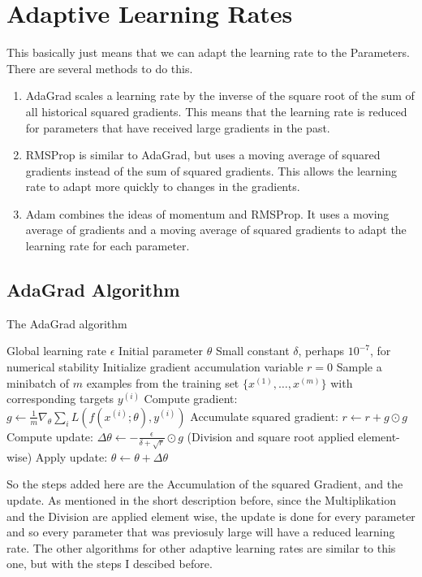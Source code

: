 \documentclass[a4paper]{article}
\begin{document}
\section{Adaptive Learning Rates}
This basically just means that we can adapt the learning rate to the Parameters. There are several methods to do this. 
\begin{enumerate}
    \item AdaGrad scales a learning rate by the inverse of the square root of the sum of all historical squared gradients. This means that the learning rate is reduced for parameters that have received large gradients in the past.
    \item RMSProp is similar to AdaGrad, but uses a moving average of squared gradients instead of the sum of squared gradients. This allows the learning rate to adapt more quickly to changes in the gradients.
    \item Adam combines the ideas of momentum and RMSProp. It uses a moving average of gradients and a moving average of squared gradients to adapt the learning rate for each parameter. 
\end{enumerate}
\subsection{AdaGrad Algorithm}
\begin{algorithm}
    \caption{The AdaGrad algorithm}
    \begin{algorithmic}
    \Require Global learning rate $\epsilon$
    \Require Initial parameter $\theta$
    \Require Small constant $\delta$, perhaps $10^{-7}$, for numerical stability
    \State Initialize gradient accumulation variable $r = 0$
        \State Sample a minibatch of $m$ examples from the training set $\{ x^{(1)}, \ldots, x^{(m)} \}$ with corresponding targets $y^{(i)}$
        \State Compute gradient: $g \leftarrow \frac{1}{m} \nabla_\theta \sum_i L(f(x^{(i)}; \theta), y^{(i)})$
        \State Accumulate squared gradient: $r \leftarrow r + g \odot g$
        \State Compute update: $\Delta \theta \leftarrow -\frac{\epsilon}{\delta + \sqrt{r}} \odot g$ \hspace{0.2cm} (Division and square root applied element-wise)
        \State Apply update: $\theta \leftarrow \theta + \Delta \theta$
    \EndWhile
    \end{algorithmic}
    \end{algorithm}
    So the steps added here are the Accumulation of the squared Gradient, and the update. As mentioned in the short description before, since the Multiplikation and the Division are applied element wise, the update is done for every parameter and so every parameter that was previosuly large will have a reduced learning rate. The other algorithms for other adaptive learning rates are similar to this one, but with the steps I descibed before.
\end{document}
